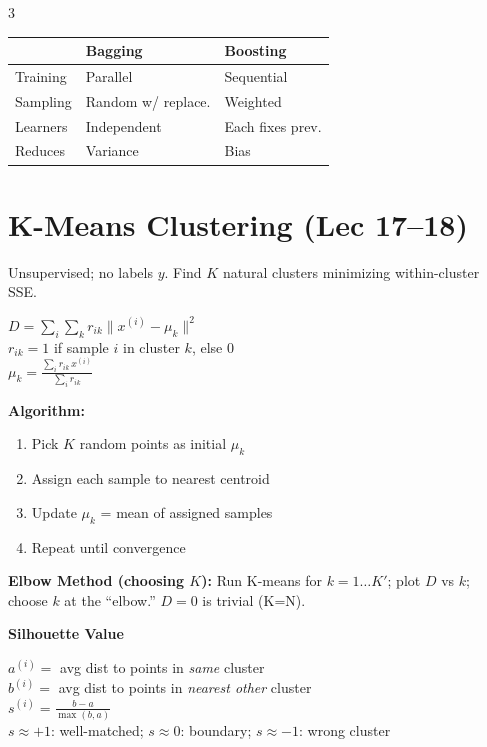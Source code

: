 \documentclass[8pt,letterpaper]{extarticle}
\begin{document}
\begin{multicols}{3}
\begin{center}\footnotesize
\begin{tabular}{@{}lll@{}}
\toprule
 & \textbf{Bagging} & \textbf{Boosting}\\
\midrule
Training & Parallel & Sequential\\
Sampling & Random w/ replace. & Weighted\\
Learners & Independent & Each fixes prev.\\
Reduces & Variance & Bias\\
\bottomrule
\end{tabular}
\end{center}

\section{K-Means Clustering (Lec 17--18)}

Unsupervised; no labels $y$. Find $K$ natural clusters minimizing within-cluster SSE.
\begin{formulabox}
$D = \sum_i\sum_k r_{ik}\|x^{(i)}-\mu_k\|^2$\\
$r_{ik} = 1$ if sample $i$ in cluster $k$, else $0$\\
$\mu_k = \frac{\sum_i r_{ik}\, x^{(i)}}{\sum_i r_{ik}}$ 
\end{formulabox}

\textbf{Algorithm:}
\begin{enumerate}
  \item Pick $K$ random points as initial $\mu_k$
  \item Assign each sample to nearest centroid
  \item Update $\mu_k$ = mean of assigned samples
  \item Repeat until convergence
\end{enumerate}

\textbf{Elbow Method (choosing $K$):} Run K-means for $k=1\ldots K'$; plot $D$ vs $k$; choose $k$ at the ``elbow.'' $D=0$ is trivial (K=N).

\textbf{Silhouette Value}
\begin{formulabox}
$a^{(i)} = $ avg dist to points in \emph{same} cluster\\
$b^{(i)} = $ avg dist to points in \emph{nearest other} cluster\\
$s^{(i)} = \frac{b-a}{\max(b,a)}$\\[2pt]
$s \approx +1$: well-matched; \quad $s \approx 0$: boundary; \quad $s \approx -1$: wrong cluster
\end{formulabox}


\end{multicols}
\end{document}
